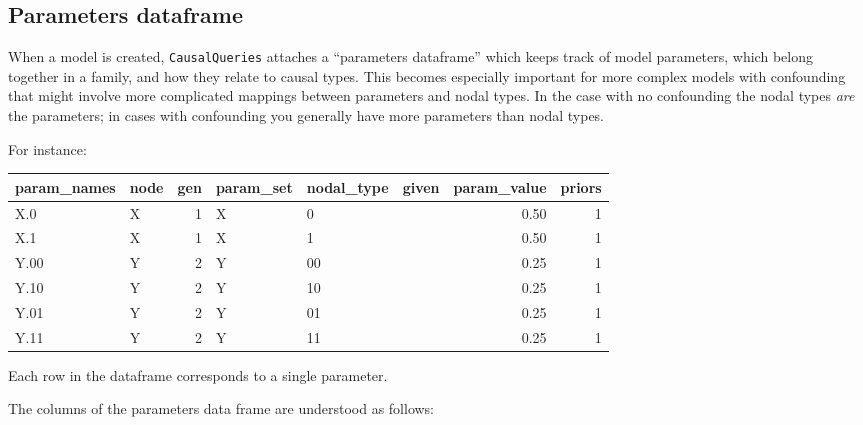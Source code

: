 \documentclass[
  12pt,
]{book}
\newenvironment{Shaded}{\begin{snugshade}}{\end{snugshade}}
\newcommand{\FunctionTok}[1]{\textcolor[rgb]{0.13,0.29,0.53}{\textbf{#1}}}
\newcommand{\NormalTok}[1]{#1}
\newcommand{\SpecialCharTok}[1]{\textcolor[rgb]{0.81,0.36,0.00}{\textbf{#1}}}
\newcommand{\StringTok}[1]{\textcolor[rgb]{0.31,0.60,0.02}{#1}}
\begin{document}
\hypertarget{parameters-dataframe}{%
\subsection{Parameters dataframe}\label{parameters-dataframe}}

When a model is created, \texttt{CausalQueries} attaches a ``parameters dataframe'' which keeps track of model parameters, which belong together in a family, and how they relate to causal types. This becomes especially important for more complex models with confounding that might involve more complicated mappings between parameters and nodal types. In the case with no confounding the nodal types \emph{are} the parameters; in cases with confounding you generally have more parameters than nodal types.

For instance:

\begin{Shaded}
\end{Shaded}

\begin{tabular}{l|l|r|l|l|l|r|r}
\hline
param\_names & node & gen & param\_set & nodal\_type & given & param\_value & priors\\
\hline
X.0 & X & 1 & X & 0 &  & 0.50 & 1\\
\hline
X.1 & X & 1 & X & 1 &  & 0.50 & 1\\
\hline
Y.00 & Y & 2 & Y & 00 &  & 0.25 & 1\\
\hline
Y.10 & Y & 2 & Y & 10 &  & 0.25 & 1\\
\hline
Y.01 & Y & 2 & Y & 01 &  & 0.25 & 1\\
\hline
Y.11 & Y & 2 & Y & 11 &  & 0.25 & 1\\
\hline
\end{tabular}

Each row in the dataframe corresponds to a single parameter.

The columns of the parameters data frame are understood as follows:
\end{document}
